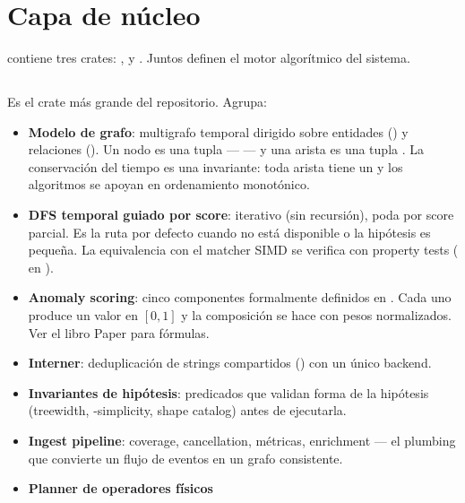 \chapter{Capa de núcleo}
\label{sec:capa-core}

 contiene tres crates: ,
 y . Juntos definen el motor
algorítmico del sistema.

\section{}

Es el crate más grande del repositorio. Agrupa:

\begin{itemize}
    \item \textbf{Modelo de grafo}: multigrafo temporal dirigido
    sobre entidades () y relaciones ().
    Un nodo es una tupla  —
     — y una arista es una tupla
    . La
    conservación del tiempo es una invariante: toda arista tiene un
     y los algoritmos se apoyan en ordenamiento monotónico.
    \item \textbf{DFS temporal guiado por score}: iterativo (sin
    recursión), poda por score parcial. Es la ruta por defecto
    cuando  no está disponible o la
    hipótesis es pequeña. La equivalencia con el matcher SIMD se
    verifica con property tests (
    en ).
    \item \textbf{Anomaly scoring}: cinco componentes formalmente
    definidos en . Cada uno produce
    un valor en $[0, 1]$ y la composición se hace con pesos
    normalizados. Ver el libro Paper para fórmulas.
    \item \textbf{Interner}: deduplicación de strings compartidos
    () con un único backend.
    \item \textbf{Invariantes de hipótesis}: predicados que validan
    forma de la hipótesis (treewidth, -simplicity, shape
    catalog) antes de ejecutarla.
    \item \textbf{Ingest pipeline}: coverage, cancellation,
    métricas, enrichment — el plumbing que convierte un flujo de
    eventos en un grafo consistente.
    \item \textbf{Planner de operadores físicos}

\end{itemize}
